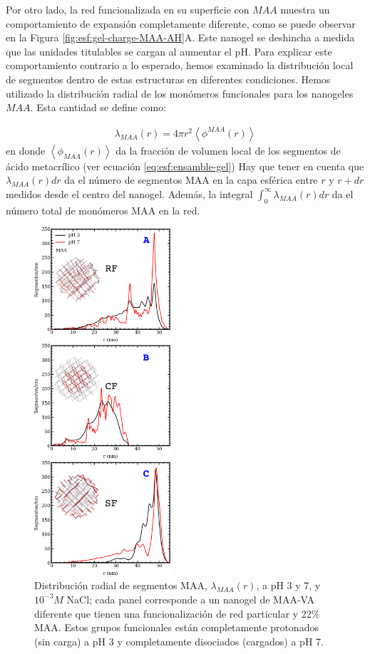 Por otro lado, la red funcionalizada en su superficie con $MAA$ muestra un comportamiento de expansi\'on completamente diferente, como se puede observar en la Figura \ref{fig:esf:gel-charge-MAA-AH}A. Este nanogel se deshincha a medida que las unidades titulables se cargan al aumentar el pH. Para explicar este comportamiento contrario a lo esperado, hemos examinado la distribuci\'on local de segmentos dentro de estas estructuras en diferentes condiciones. Hemos utilizado la distribuci\'on radial de los mon\'omeros funcionales para los nanogeles $MAA$. Esta cantidad se define como:



%
\begin{align}
    \lambda_{MAA}(r)= 4\pi r^2\left<\phi^{MAA}(r)\right>
\end{align}
%
\noindent en donde $\left<\phi_{MAA}(r)\right>$ da la fracci\'on de volumen local de los segmentos de \'acido metacr\'ilico (ver ecuaci\'on \ref{eq:esf:ensamble-gel})
Hay que tener en cuenta que $\lambda_{MAA}(r) dr$ da el n\'umero de segmentos MAA en la capa esf\'erica entre $r$ y $r+dr$ medidos desde el centro del nanogel.
Adem\'as, la integral $\int_0^\infty \lambda_{MAA}(r) dr$ da el n\'umero total de mon\'omeros MAA en la red.


\begin{figure}[!htb]
     \centering
     \includegraphics[width=0.45\textwidth]{Figures/graphs-gel2/dist-MAA.pdf}
     \caption{Distribuci\'on radial de segmentos MAA, $\lambda_{MAA}(r)$, a pH 3 y 7, y $10^{-3}M$ NaCl; cada panel corresponde a un nanogel de  MAA-VA diferente que tienen una funcionalizaci\'on de red particular y 22\% MAA.
     	Estos grupos funcionales est\'an completamente protonados (sin carga) a pH 3 y completamente disociados (cargados) a pH 7.}
     \label{fig:esf:MAA-vs-r-distribution}
 \end{figure}

